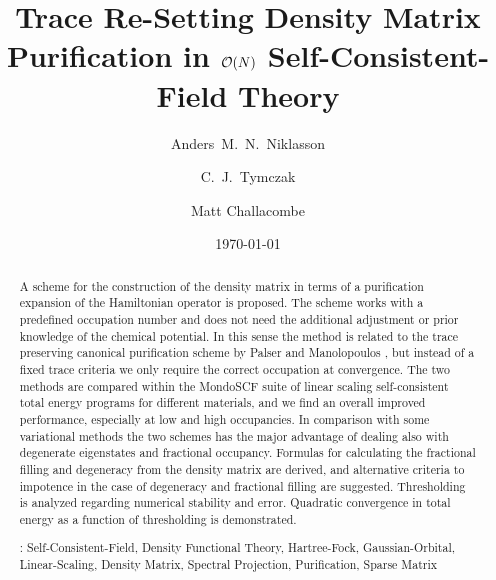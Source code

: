 \commentoutA{\documentclass[prb,aps,twocolumn,twocolumngrid,secnumarabic]{revtex4}}
\begin{document}
\date{\today}

\title{Trace Re-Setting Density Matrix Purification in ${\cal O}(N)$ Self-Consistent-Field Theory\footnotemark[4] }

\author{Anders~M.~N.~Niklasson\footnotemark[2]}
\author{C.~J.~Tymczak\footnotemark[3]}
\author{Matt Challacombe\footnotemark[6]}

\begin{abstract}
A scheme for the construction of the density matrix in terms of
a purification expansion of the Hamiltonian operator is proposed. The scheme
works with a predefined occupation number and does not need
the additional adjustment or prior knowledge of the chemical potential.
In this sense the method is related to the trace preserving canonical 
purification scheme by Palser and Manolopoulos \cite{RMcWeeny60,APalser99}, 
but instead of a fixed trace criteria we only require the correct
occupation at convergence. The two methods are
compared within the MondoSCF suite of linear scaling self-consistent total energy
programs \cite{MondoSCF} for different materials, and we find an overall 
improved performance, especially at low and high occupancies. In comparison
with some variational methods the two schemes has the major advantage of
dealing also with degenerate eigenstates and fractional occupancy. 
Formulas for calculating the fractional filling and degeneracy from 
the density matrix are derived, and alternative criteria to impotence
in the case of degeneracy and fractional filling are suggested.
Thresholding is analyzed regarding numerical stability and error.
Quadratic convergence in total energy as a function of thresholding
is demonstrated.

\smallskip
{}: Self-Consistent-Field, Density Functional Theory, Hartree-Fock, Gaussian-Orbital, 
                         Linear-Scaling, Density Matrix, Spectral Projection, Purification, Sparse Matrix
\end{abstract}

\pacs{}


\maketitle
\end{document}

